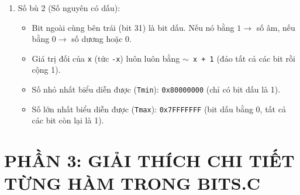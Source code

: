 \documentclass[12pt, a4paper]{article}
\begin{document}
\begin{enumerate}
    \item Số bù 2 (Số nguyên có dấu):
    \begin{itemize}
        \item Bit ngoài cùng bên trái (bit 31) là bit dấu. Nếu nó bằng $1 \rightarrow$ số âm, nếu bằng $0 \rightarrow$ số dương hoặc 0.
        \item Giá trị đối của \texttt{x} (tức \texttt{-x}) luôn luôn bằng \texttt{\(\sim\) x + 1} (đảo tất cả các bit rồi cộng 1).
        \item Số nhỏ nhất biểu diễn được (\texttt{Tmin}): \texttt{0x80000000} (chỉ có bit dấu là 1).
        \item Số lớn nhất biểu diễn được (\texttt{Tmax}): \texttt{0x7FFFFFFF} (bit dấu bằng 0, tất cả các bit còn lại là 1).
    \end{itemize}
\end{enumerate}

\newpage

\section{PHẦN 3: GIẢI THÍCH CHI TIẾT TỪNG HÀM TRONG BITS.C}
\end{document}

